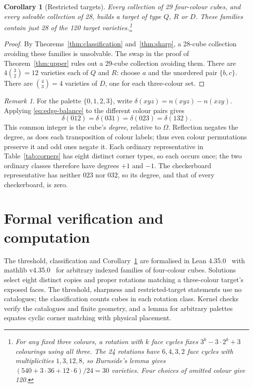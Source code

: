 \documentclass[11pt]{article}
\newtheorem{corollary}{Corollary}
\theoremstyle{remark}
\newtheorem*{remark}{Remark}
\begin{document}
\begin{corollary}[Restricted targets]\label{cor:restricted}
Every collection of 29 four-colour cubes, and every solvable collection of
28, builds a target of type $Q$, $R$ or $D$. These families contain just
28 of the 120 target varieties.\footnote{For any fixed three colours, a
rotation with $k$ face cycles fixes $3^k-3\cdot2^k+3$ colourings using all
three. The 24 rotations have $6,4,3,2$ face cycles with multiplicities
$1,3,12,8$, so Burnside's lemma gives
$(540+3\cdot36+12\cdot6)/24=30$ varieties. Four choices of omitted colour
give 120.}
\end{corollary}
\begin{proof}
By Theorems~\ref{thm:classification} and~\ref{thm:sharp}, a 28-cube collection
avoiding these families is unsolvable. The swap in the proof of
Theorem~\ref{thm:upper} rules out a 29-cube collection avoiding them.
There are $4\binom{3}{2}=12$ varieties each of $Q$ and $R$: choose $a$ and
the unordered pair $\{b,c\}$. There are $\binom{4}{3}=4$ varieties of $D$,
one for each three-colour set.
\end{proof}

\begin{remark}
For the palette $\{0,1,2,3\}$, write
$\delta(xyz)=n(xyz)-n(xzy)$. Applying \eqref{eq:edge-balance} to the
different colour pairs gives
\[
 \delta(012)=\delta(031)=\delta(023)=\delta(132).
\]
This common integer is the cube's \emph{degree}, relative to $\Omega$.
Reflection negates the degree, as does each transposition of colour labels;
thus even colour permutations preserve it and odd ones negate it.
Each ordinary representative in Table~\ref{tab:corners} has eight distinct
corner types, so each occurs once; the two ordinary classes therefore
have degrees $+1$ and $-1$. The checkerboard representative has neither
$023$ nor $032$, so its degree, and that of every checkerboard, is zero.
\end{remark}

\section{Formal verification and computation}
The threshold, classification and Corollary~\ref{cor:restricted} are
formalised in Lean 4.35.0~\cite{Lean4} with mathlib v4.35.0~\cite{mathlib}
for arbitrary indexed families of four-colour cubes. Solutions select
eight distinct copies and proper rotations matching a three-colour target's
exposed faces. The threshold, sharpness and restricted-target statements
use no catalogues; the classification counts cubes in each rotation class.
Kernel checks verify the catalogues and finite geometry, and a lemma for
arbitrary palettes equates cyclic corner matching with physical placement.
\end{document}
